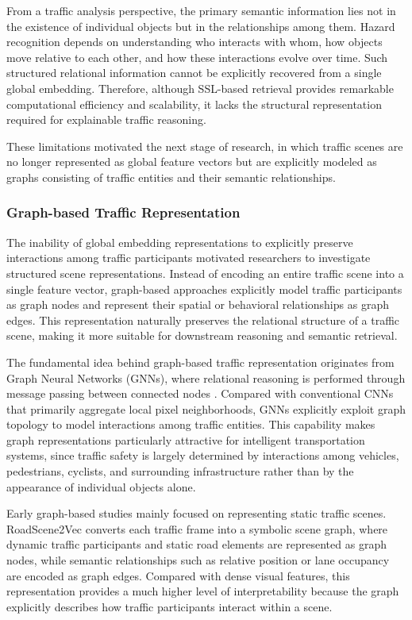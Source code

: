 \documentclass[a4paper, 11pt]{article} %
\begin{document}
From a traffic analysis perspective, the primary semantic information lies not in the existence of individual objects but in the relationships among them. Hazard recognition depends on understanding who interacts with whom, how objects move relative to each other, and how these interactions evolve over time. Such structured relational information cannot be explicitly recovered from a single global embedding. Therefore, although SSL-based retrieval provides remarkable computational efficiency and scalability, it lacks the structural representation required for explainable traffic reasoning.

These limitations motivated the next stage of research, in which traffic scenes are no longer represented as global feature vectors but are explicitly modeled as graphs consisting of traffic entities and their semantic relationships.
\subsubsection{Graph-based Traffic Representation}

The inability of global embedding representations to explicitly preserve interactions among traffic participants motivated researchers to investigate structured scene representations. Instead of encoding an entire traffic scene into a single feature vector, graph-based approaches explicitly model traffic participants as graph nodes and represent their spatial or behavioral relationships as graph edges. This representation naturally preserves the relational structure of a traffic scene, making it more suitable for downstream reasoning and semantic retrieval.

The fundamental idea behind graph-based traffic representation originates from Graph Neural Networks (GNNs), where relational reasoning is performed through message passing between connected nodes \cite{li2020learning}. Compared with conventional CNNs that primarily aggregate local pixel neighborhoods, GNNs explicitly exploit graph topology to model interactions among traffic entities. This capability makes graph representations particularly attractive for intelligent transportation systems, since traffic safety is largely determined by interactions among vehicles, pedestrians, cyclists, and surrounding infrastructure rather than by the appearance of individual objects alone.

Early graph-based studies mainly focused on representing static traffic scenes. RoadScene2Vec \cite{malawade2022roadscene2vec} converts each traffic frame into a symbolic scene graph, where dynamic traffic participants and static road elements are represented as graph nodes, while semantic relationships such as relative position or lane occupancy are encoded as graph edges. Compared with dense visual features, this representation provides a much higher level of interpretability because the graph explicitly describes how traffic participants interact within a scene.
\end{document}
